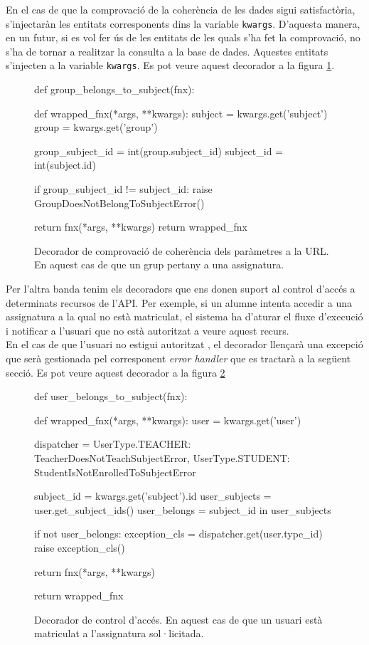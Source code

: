 En el cas de que la comprovació de la coherència de les dades sigui satisfactòria, s'injectaràn les entitats corresponents dins la variable \texttt{kwargs}. D'aquesta manera, en un futur, si es vol fer ús de les entitats de les quals s'ha fet la comprovació, no s'ha de tornar a realitzar la consulta a la base de dades. Aquestes entitats s'injecten a la variable \texttt{kwargs}. Es pot veure aquest decorador a la figura \ref{fig:decorador_coherencia}.

\begin{figure}[h!]
	\begin{python}
def group_belongs_to_subject(fnx):

	def wrapped_fnx(*args, **kwargs):
		subject = kwargs.get('subject')
		group = kwargs.get('group')
		
		group_subject_id = int(group.subject_id)
		subject_id = int(subject.id)
		
		if group_subject_id != subject_id:
			raise GroupDoesNotBelongToSubjectError()
		
		return fnx(*args, **kwargs)
	return wrapped_fnx
	\end{python}
	\label{fig:decorador_coherencia}
	\caption{Decorador de comprovació de coherència dels paràmetres a la \ac{URL}. En aquest cas de que un grup pertany a una assignatura.}
\end{figure}

Per l'altra banda tenim els decoradors que ens donen suport al control d'accés a determinats recursos de l'\ac{API}. Per exemple, si un alumne intenta accedir a una assignatura a la qual no està matriculat, el sistema ha d'aturar el fluxe d'execució i notificar a l'usuari que no està autoritzat a veure aquest recurs. \\

En el cas de que l'usuari no estigui autoritzat , el decorador llençarà una excepció que serà gestionada pel corresponent \emph{error handler} que es tractarà a la següent secció. Es pot veure aquest decorador a la figura \ref{fig:decorador_control_acces}

\begin{figure}[h!]
	\begin{python}
def user_belongs_to_subject(fnx):
	
	def wrapped_fnx(*args, **kwargs):
		user = kwargs.get('user')
		
		dispatcher = {
			UserType.TEACHER: TeacherDoesNotTeachSubjectError,
			UserType.STUDENT: StudentIsNotEnrolledToSubjectError
		}
		
		subject_id = kwargs.get('subject').id
		user_subjects = user.get_subject_ids()
		user_belongs = subject_id in user_subjects
		
		if not user_belongs:
			exception_cls = dispatcher.get(user.type_id)
			raise exception_cls()
		
		return fnx(*args, **kwargs)
	
	return wrapped_fnx
	\end{python}
	\label{fig:decorador_control_acces}
	\caption{Decorador de control d'accés. En aquest cas de que un usuari està matriculat a l'assignatura sol·licitada.}
\end{figure}

